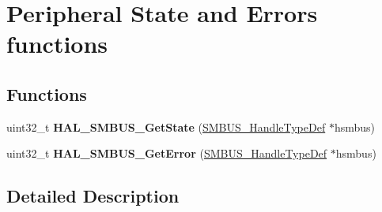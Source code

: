 \hypertarget{group___s_m_b_u_s___exported___functions___group3}{}\section{Peripheral State and Errors functions}
\label{group___s_m_b_u_s___exported___functions___group3}
\subsection*{Functions}
\begin{DoxyCompactItemize}
\item 
\mbox{\label{group___s_m_b_u_s___exported___functions___group3_ga78427c3d4579a25dbfb539d55e143c01}} 
uint32\+\_\+t {\bfseries H\+A\+L\+\_\+\+S\+M\+B\+U\+S\+\_\+\+Get\+State} (\hyperlink{struct_s_m_b_u_s___handle_type_def}{S\+M\+B\+U\+S\+\_\+\+Handle\+Type\+Def} $\ast$hsmbus)
\item 
\mbox{\label{group___s_m_b_u_s___exported___functions___group3_ga293b7c153c287b5fabed224d1856326d}} 
uint32\+\_\+t {\bfseries H\+A\+L\+\_\+\+S\+M\+B\+U\+S\+\_\+\+Get\+Error} (\hyperlink{struct_s_m_b_u_s___handle_type_def}{S\+M\+B\+U\+S\+\_\+\+Handle\+Type\+Def} $\ast$hsmbus)
\end{DoxyCompactItemize}


\subsection{Detailed Description}
